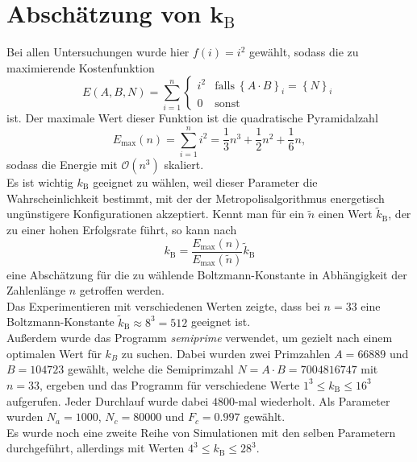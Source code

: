 \section{\texorpdfstring{Abschätzung von $\bm{k_\mathrm{B}}$}{Abschätzung von kB}}\label{sec:kbguess}
Bei allen Untersuchungen wurde hier $f\left(i\right)=i^2$ gewählt, sodass die zu maximierende Kostenfunktion
\begin{equation*}
		E\left(A,B,N\right)=\sum\limits_{i=1}^n\begin{cases}
    i^2 & \mathrm{falls}\:{\left\{A\cdot B\right\}}_i={\left\{N\right\}}_i \\
	0 & \mathrm{sonst}
  \end{cases}
\end{equation*}
ist. Der maximale Wert dieser Funktion ist die quadratische Pyramidalzahl~\parencite{oeis}
\begin{equation*}
		E_{\mathrm{\max}}\left(n\right)=\sum\limits_{i=1}^n i^2=\frac{1}{3}n^3+\frac{1}{2}n^2+\frac{1}{6}n,\label{eq:kbguess}
\end{equation*}
sodass die Energie mit $\mathcal{O}\left(n^3\right)$ skaliert. \\
Es ist wichtig $k_\mathrm{B}$ geeignet zu wählen, weil dieser Parameter die Wahrscheinlichkeit bestimmt, mit der der Metropolisalgorithmus energetisch ungünstigere Konfigurationen akzeptiert. Kennt man für ein $\tilde{n}$ einen Wert $\tilde{k}_\mathrm{B}$, der zu einer hohen Erfolgsrate  führt, so kann nach
\begin{equation*}
		k_\mathrm{B}=\frac{E_{\mathrm{\max}}\left(n\right)}{E_{\mathrm{\max}}\left(\tilde{n}\right)}\tilde{k}_\mathrm{B}
\end{equation*}
eine Abschätzung für die zu wählende Boltzmann-Konstante in Abhängigkeit der Zahlenlänge $n$ getroffen werden. \\
Das Experimentieren mit verschiedenen Werten zeigte, dass bei $n=33$ eine Boltzmann-Konstante $\tilde{k}_\mathrm{B}\approx 8^3=512$ geeignet ist. \\
Außerdem wurde das Programm \textit{semiprime} verwendet, um gezielt nach einem optimalen Wert für $k_B$ zu suchen. Dabei wurden zwei Primzahlen $A=66889$ und $B=104723$ gewählt, welche die Semiprimzahl $N=A\cdot B=7004816747$ mit $n=33$, ergeben und das Programm für verschiedene Werte $1^3\leq k_\mathrm{B}\leq 16^3$ aufgerufen. Jeder Durchlauf wurde dabei $4800$-mal wiederholt. Als Parameter wurden $N_a=1000$, $N_c=80000$ und $F_c=0.997$ gewählt. \\
Es wurde noch eine zweite Reihe von Simulationen mit den selben Parametern durchgeführt, allerdings mit Werten $4^3\leq k_\mathrm{B} \leq 28^3$.
